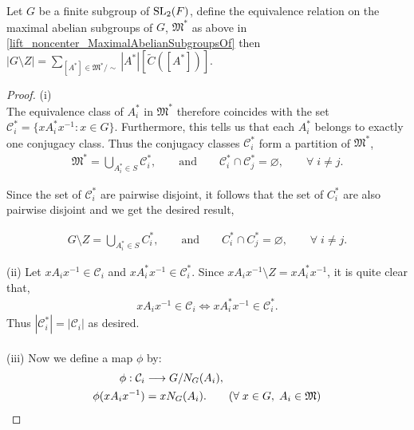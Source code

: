 \begin{theorem}
  \label{card_noncenter_fin_subgroup_eq_sum_card_noncenter_mul_index_normalizer}

Let $G$ be a finite subgroup of $\operatorname{SL}_2(F)$, define the equivalence relation on the maximal abelian subgroups of $G$, $\mathfrak{M}^*$ as above in \ref{lift_noncenter_MaximalAbelianSubgroupsOf}
then 
$|G \! \setminus  \! Z| = \sum_{[A^*] \in \mathfrak{M}^* / \sim} |A^*| [\tilde{C}([A^*])].$

\end{theorem}

\begin{proof}
(i)
\\
The equivalence class of $A_i^*$ in $\mathfrak{M}^*$ therefore coincides with the set $\mathcal{C}_i^* = \{ xA_i^*x^{-1} : x \in G \}$. Furthermore, this tells us that each $A_i^*$ belongs to exactly one conjugacy class. Thus the conjugacy classes $\mathcal{C}_i^*$ form a partition of $\mathfrak{M}^*$,
\begin{align*} \mathfrak{M}^* = \bigcup\limits_{A_i^* \in S} \mathcal{C}_i^*,  \qquad \text{and}  \qquad \mathcal{C}_i^* \cap \mathcal{C}_j^* = \varnothing, \qquad \forall \; i \neq j.
\end{align*}

Since the set of $\mathcal{C}_i^*$ are pairwise disjoint, it follows that the set of $C_i^*$ are also pairwise disjoint and we get the desired result,

\begin{align*} G \! \setminus \! Z = \bigcup\limits_{A_i^* \in S} C_i^*,  \qquad \text{and}  \qquad C_i^* \cap C_j^* = \varnothing, \qquad \forall \; i \neq j.
\end{align*}

(ii) Let $x A_i x^{-1} \in \mathcal{C}_i$ and $x A_i^* x^{-1} \in \mathcal{C}_i^*$. Since $x A_i x^{-1} \! \setminus \! Z = x A_i^* x^{-1}$, it is quite clear that,
\begin{align*} x A_i x^{-1} \in \mathcal{C}_i \iff x A_i^* x^{-1} \in \mathcal{C}_i^*.
\end{align*}
Thus $|\mathcal{C}_i^*| = |\mathcal{C}_i|$ as desired. \\
\\
(iii) Now we define a map $\phi$ by:
\begin{align*} \phi: \mathcal{C}_i &\longrightarrow G / N_G(A_i),
\\ \phi(xA_ix^{-1}) &= xN_G(A_i). \tag{$\forall \; x \in G, \; A_i \in \mathfrak{M}$}
\end{align*}


\end{proof}
